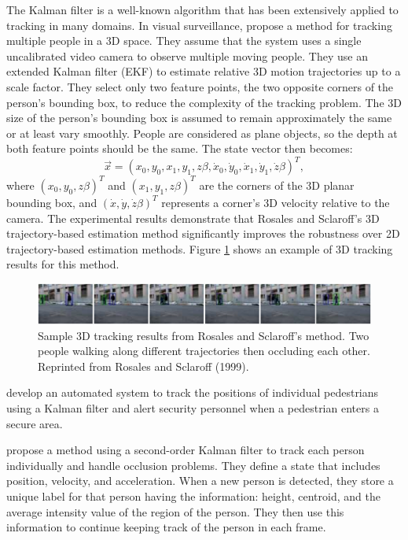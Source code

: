 The Kalman filter  is a well-known
algorithm that has been extensively applied to tracking in many
domains.  In visual surveillance, 
propose a method for tracking multiple people in a 3D space. They
assume that the system uses a single uncalibrated video camera to
observe multiple moving people. They use an extended Kalman filter
(EKF) to estimate relative 3D motion trajectories up to a scale
factor.  They select only two feature points, the two opposite corners
of the person's bounding box, to reduce the complexity of the tracking
problem. The 3D size of the person's bounding box is assumed to remain
approximately the same or at least vary smoothly. People are
considered as plane objects, so the depth at both feature points
should be the same. The state vector then becomes:
\[
  \vec{x} = (x_0 ,y_0 ,x_1 ,y_1 ,z\beta ,\dot x_0 ,\dot y_0
  ,\dot x_1 ,\dot y_1 ,\dot z\beta )^T,
\]
where $(x_0, y_0, z\beta)^T$ and $(x_1, y_1, z\beta)^T$ are the
corners of the 3D planar bounding box, and $(\dot x, \dot y, \dot
z\beta)^T$ represents a corner's 3D velocity relative to the
camera. The experimental results demonstrate that Rosales and
Sclaroff's 3D trajectory-based estimation method significantly
improves the robustness over 2D trajectory-based estimation methods.
Figure \ref{fig:rosales-tracking-result} shows an example of 3D
tracking results for this method.

\begin{figure}[t]
  \centering
  \includegraphics[width=6in]{figures/rosales-tracking-result.png}
  \caption[Sample 3D tracking results from Rosales and Sclaroff's
    method.]{\small Sample 3D tracking results from Rosales and
    Sclaroff's method. Two people walking along different trajectories
    then occluding each other. Reprinted from Rosales and Sclaroff
    (1999).}
  \label{fig:rosales-tracking-result}
\end{figure}

 develop an automated system to track
the positions of individual pedestrians using a Kalman filter and
alert security personnel when a pedestrian enters a secure area.

 propose a method using a second-order
Kalman filter to track each person individually and handle occlusion
problems. They define a state that includes position, velocity, and
acceleration. When a new person is detected, they store a unique label
for that person having the information: height, centroid, and the
average intensity value of the region of the person. They then use
this information to continue keeping track of the person in each
frame.

